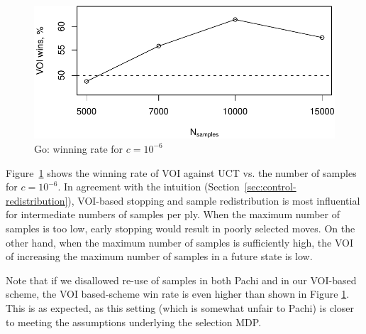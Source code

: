 \documentclass[]{article}
\begin{document}
\begin{figure}[h!]
\centering
\includegraphics[scale=0.6]{voi-wins.pdf}
\caption{Go: winning rate for $c=10^{-6}$}
\label{fig:voi-wins}
\end{figure}

Figure~\ref{fig:voi-wins}
shows the winning rate of VOI against UCT vs. the number of
samples for $c=10^{-6}$. In agreement with the intuition
(Section~\ref{sec:control-redistribution}), VOI-based stopping and
sample redistribution is most influential for intermediate numbers of
samples per ply. When the maximum number of samples is too low, early
stopping would result in poorly selected moves. On the other hand,
when the maximum number of samples is sufficiently high, the VOI of
increasing the maximum number of samples in a future state is low.

Note that if we disallowed re-use of samples in both Pachi and
in our VOI-based scheme, the VOI based-scheme
win rate is even higher than shown in Figure \ref{fig:voi-wins}. This is as expected,
as this setting (which is somewhat unfair to Pachi) is closer to
meeting the assumptions underlying the selection MDP.



\end{document}
